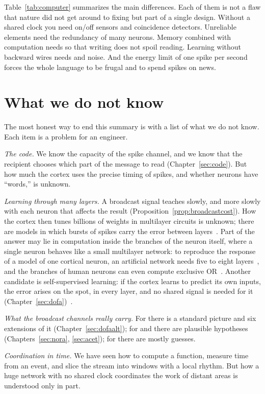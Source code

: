 Table~\ref{tab:computer} summarizes the main differences. Each of them is not a flaw that nature did not get around to fixing but part of a single design. Without a shared clock you need on/off sensors and coincidence detectors. Unreliable elements need the redundancy of many neurons. Memory combined with computation needs  so that writing does not spoil reading. Learning without backward wires needs  and noise. And the energy limit of one spike per second forces the whole language to be frugal and to spend spikes on news.

\section{What we do not know}

The most honest way to end this summary is with a list of what we do not know. Each item is a problem for an engineer.

\emph{The code.} We know the capacity of the spike channel, and we know that the recipient chooses which part of the message to read (Chapter~\ref{sec:code}). But how much the cortex uses the precise timing of spikes, and whether neurons have ``words,'' is unknown.

\emph{Learning through many layers.} A broadcast signal teaches slowly, and more slowly with each neuron that affects the result (Proposition~\ref{prop:broadcastcost}). How the cortex then tunes billions of weights in multilayer circuits is unknown; there are models in which bursts of spikes carry the error between layers~\cite{Payeur2021}. Part of the answer may lie in computation inside the branches of the neuron itself, where a single neuron behaves like a small multilayer network: to reproduce the response of a model of one cortical neuron, an artificial network needs five to eight layers~\cite{Beniaguev2021}, and the branches of human neurons can even compute exclusive OR~\cite{Gidon2020}. Another candidate is self-supervised learning: if the cortex learns to predict its own inputs, the error arises on the spot, in every layer, and no shared signal is needed for it (Chapter~\ref{sec:dofa})~\cite{Keller2018}.

\emph{What the broadcast channels really carry.} For  there is a standard picture and six extensions of it (Chapter~\ref{sec:dofaalt}); for  and  there are plausible hypotheses (Chapters~\ref{sec:nora}, \ref{sec:acet}); for  there are mostly guesses.

\emph{Coordination in time.} We have seen how to compute a function, measure time from an event, and slice the stream into windows with a local rhythm. But how a huge network with no shared clock coordinates the work of distant areas is understood only in part.

